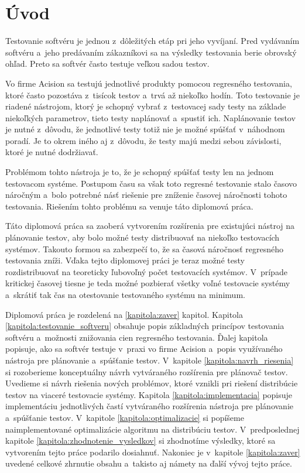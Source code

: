 


%
%
\chapter{Úvod}
\label{kapitola:uvod}
Testovanie softvéru je jednou z~dôležitých etáp pri jeho vyvíjaní.
Pred vydávaním softvéru a~jeho predávaním zákazníkovi sa na výsledky
testovania berie obrovský ohľad. Preto sa softvér často testuje veľkou
sadou testov.

Vo firme Acision sa testujú jednotlivé produkty pomocou regresného 
testovania, ktoré často pozostáva z~tisícok testov a~trvá až niekoľko hodín.
Toto testovanie je riadené nástrojom, ktorý je schopný vybrať 
z~testovacej sady testy na základe niekoľkých parametrov, tieto testy 
naplánovať a~spustiť ich. 
Naplánovanie testov je nutné z~dôvodu, že jednotlivé testy totiž nie je 
možné spúšťať v~náhodnom poradí. Je to okrem iného aj z~dôvodu, 
že testy majú medzi sebou závislosti, ktoré je nutné dodržiavať. 

Problémom tohto nástroja je to, že je schopný spúšťať testy len na
jednom testovacom systéme. Postupom času sa však toto regresné testovanie
stalo časovo náročným a~bolo potrebné násť riešenie pre zníženie časovej
náročnosti tohoto testovania. 
Riešením tohto problému sa venuje táto diplomová práca.

Táto diplomová práca sa zaoberá vytvorením rozšírenia pre existujúci
nástroj na plánovanie testov, aby bolo možné testy distribuovať na 
niekoľko testovacích systémov. Takouto formou sa zabezpečí to, že 
sa časová náročnosť regresného testovania zníži. 
Vďaka tejto diplomovej práci je teraz možné testy rozdistribuovať na 
teoreticky ľubovoľný počet testovacích systémov.
V~prípade kritickej časovej tiesne je teda možné pozbierať všetky voľné
testovacie systémy a~skrátiť tak čas na otestovanie testovaného systému
na minimum.

Diplomová práca je rozdelená na \ref{kapitola:zaver} kapitol. 
Kapitola \ref{kapitola:testovanie_softveru} obsahuje popis základných
princípov testovania softvéru a~možnosti znižovania cien regresného testovania.
Ďalej kapitola popisuje, ako sa softvér testuje v~praxi vo firme Acision
a~popis využívaného nástroja pre plánovanie a~spúšťanie testov.
V~kapitole \ref{kapitola:navrh_riesenia} si rozoberieme konceptuálny
návrh vytváraného rozšírenia pre plánovač testov. 
Uvedieme si návrh riešenia nových problémov, ktoré vznikli pri riešení
distribúcie testov na viaceré testovacie systémy.
Kapitola \ref{kapitola:implementacia} popisuje implementáciu jednotlivých
častí vytváraného rozšírenia nástroja pre plánovanie a~spúšťanie testov.
V~kapitole \ref{kapitola:optimalizacie} si popíšeme naimplementované 
optimalizácie algoritmu na distribúciu testov. V~predposlednej kapitole 
\ref{kapitola:zhodnotenie_vysledkov} si zhodnotíme výsledky, ktoré sa 
vytvorením tejto práce podarilo dosiahnuť. Nakoniec je v~kapitole
\ref{kapitola:zaver} uvedené celkové zhrnutie obsahu a~takisto aj námety
na ďalší vývoj tejto práce. 



